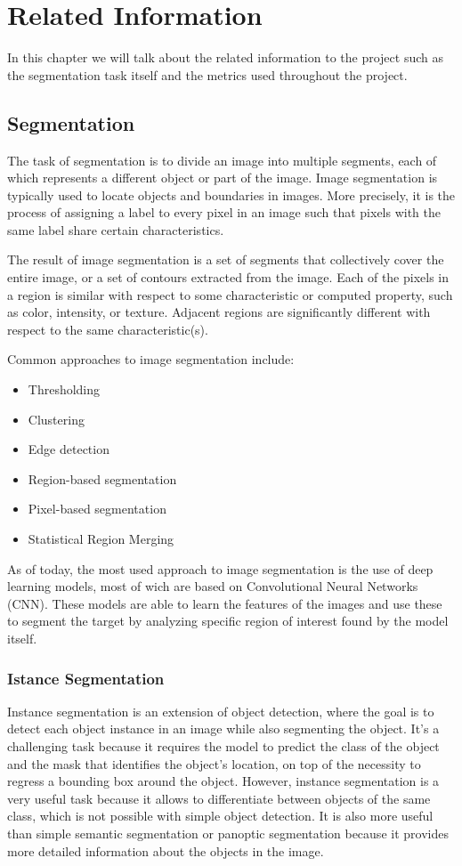 \chapter{Related Information}
In this chapter we will talk about the related information to the project such as the segmentation task itself and the metrics used throughout the project.

\section{Segmentation}
The task of segmentation is to divide an image into multiple segments, each of which represents a different object or part of the image. Image segmentation is typically used to locate objects and boundaries in images. More precisely, it is the process of assigning a label to every pixel in an image such that pixels with the same label share certain characteristics. 

The result of image segmentation is a set of segments that collectively cover the entire image, or a set of contours extracted from the image. Each of the pixels in a region is similar with respect to some characteristic or computed property, such as color, intensity, or texture. Adjacent regions are significantly different with respect to the same characteristic(s).

Common approaches to image segmentation include:
\begin{itemize}
    \item Thresholding
    \item Clustering
    \item Edge detection
    \item Region-based segmentation
    \item Pixel-based segmentation
    \item Statistical Region Merging
\end{itemize}

As of today, the most used approach to image segmentation is the use of deep learning models, most of wich are based on Convolutional Neural Networks (CNN). These models are able to learn the features of the images and use these to segment the target by analyzing specific region of interest found by the model itself.


\subsection*{Istance Segmentation}
Instance segmentation is an extension of object detection, where the goal is to detect each object instance in an image while also segmenting the object. 
It's a challenging task because it requires the model to predict the class of the object and the mask that identifies the object's location, on top of the necessity to regress a bounding box around the object. 
However, instance segmentation is a very useful task because it allows to differentiate between objects of the same class, which is not possible with simple object detection. It is also more useful than simple semantic segmentation or panoptic segmentation because it provides more detailed information about the objects in the image. 

